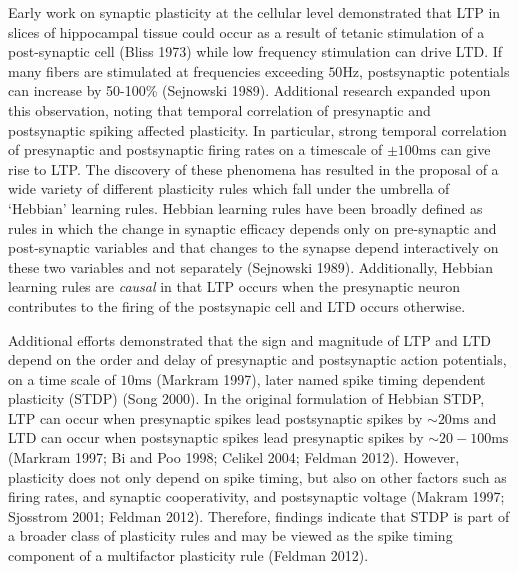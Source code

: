 \documentclass{ucetd}
\begin{document}
Early work on synaptic plasticity at the cellular level demonstrated that LTP in slices of hippocampal tissue could occur as a result of tetanic stimulation of a post-synaptic cell (Bliss 1973) while low frequency stimulation can drive LTD. If many fibers are stimulated at frequencies exceeding $50\text{Hz}$, postsynaptic potentials can increase by 50-100\% (Sejnowski 1989). Additional research expanded upon this observation, noting that temporal correlation of presynaptic and postsynaptic spiking affected plasticity. In particular, strong temporal correlation of presynaptic and postsynaptic firing rates on a timescale of $\pm 100 \text{ms}$ can give rise to LTP. The discovery of these phenomena has resulted in the proposal of a wide variety of different plasticity rules which fall under the umbrella of `Hebbian' learning rules. Hebbian learning rules have been broadly defined as rules in which the change in synaptic efficacy depends only on pre-synaptic and post-synaptic variables and that changes to the synapse depend interactively on these two variables and not separately (Sejnowski 1989).  Additionally, Hebbian learning rules are \emph{causal} in that LTP occurs when the presynaptic neuron contributes to the firing of the postsynapic cell and LTD occurs otherwise.

Additional efforts demonstrated that the sign and magnitude of LTP and LTD depend on the order and delay of presynaptic and postsynaptic action potentials, on a time scale of $10\text{ms}$ (Markram 1997), later named spike timing dependent plasticity (STDP) (Song 2000). In the original formulation of Hebbian STDP, LTP can occur when presynaptic spikes lead postsynaptic spikes by $\sim 20\mathrm{ms}$ and LTD can occur when postsynaptic spikes lead presynaptic spikes by $\sim 20-100\mathrm{ms}$ (Markram 1997; Bi and Poo 1998; Celikel 2004; Feldman 2012). However, plasticity does not only depend on spike timing, but also on other factors such as firing rates, and synaptic cooperativity, and postsynaptic voltage (Makram 1997; Sjosstrom 2001; Feldman 2012). Therefore, findings indicate that STDP is part of a broader class of plasticity rules and may be viewed as the spike timing component of a multifactor plasticity rule (Feldman 2012).
\end{document}
